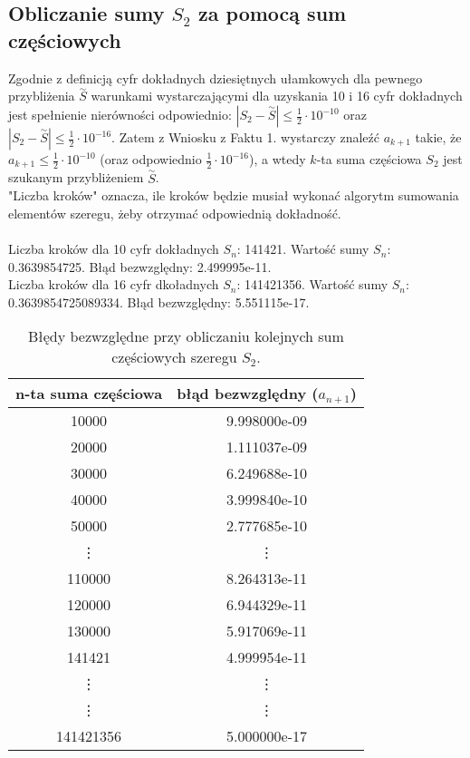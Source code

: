 \documentclass{article}
\begin{document}
\subsection{Obliczanie sumy $S_2$ za pomocą sum częściowych}
\indent\hspace{4mm}Zgodnie z definicją cyfr dokładnych dziesiętnych ułamkowych\cite{cyfry} dla pewnego przybliżenia $\overset{\sim}{S}$ warunkami wystarczającymi dla uzyskania 10 i 16 cyfr dokładnych
jest spełnienie nierówności odpowiednio: $|S_2 - \overset{\sim}{S}| \leqslant \frac{1}{2}\cdot 10^{-10} $ oraz $|S_2 - \overset{\sim}{S}| \leqslant \frac{1}{2}\cdot 10^{-16} $.
Zatem z Wniosku z Faktu 1. wystarczy znaleźć $a_{k+1}$ takie, że $a_{k+1} \leqslant \frac{1}{2}\cdot 10^{-10}$ (oraz odpowiednio $\frac{1}{2}\cdot 10^{-16}$), a wtedy $k$-ta suma
częściowa $S_2$ jest szukanym przybliżeniem $\overset{\sim}{S}$.
\\
"Liczba kroków" oznacza, ile kroków będzie musiał wykonać algorytm sumowania elementów szeregu, żeby otrzymać odpowiednią dokładność.\\
\\
Liczba kroków dla 10 cyfr dokładnych $S_n$: 141421. 	Wartość sumy $S_n$: 0.3639854725.	Błąd bezwzględny: 2.499995e-11.\\
Liczba kroków dla 16 cyfr dkoładnych $S_n$: 141421356.	Wartość sumy $S_n$: 0.3639854725089334.	Błąd bezwzględny: 5.551115e-17.\\
\clearpage
\begin{table}[h]
	\centering
	\begin{tabular}{|c|c|} \hline
		n-ta suma częściowa & błąd bezwzględny ($a_{n+1}$) \\ \hline
		10000 &  9.998000e-09\\
		20000 &  1.111037e-09\\
		30000 &  6.249688e-10\\
		40000 &  3.999840e-10\\
		50000 &  2.777685e-10\\
		\vdots & \vdots \\
		110000  &  8.264313e-11 \\
		120000 &  6.944329e-11 \\
		130000 & 5.917069e-11\\
		141421 & 4.999954e-11\\
		\vdots & \vdots \\
		\vdots & \vdots \\
		141421356 & 5.000000e-17\\
		\hline
	\end{tabular}
	\caption{Błędy bezwzględne przy obliczaniu kolejnych sum częściowych szeregu $S_2$.}
\end{table}
\end{document}

